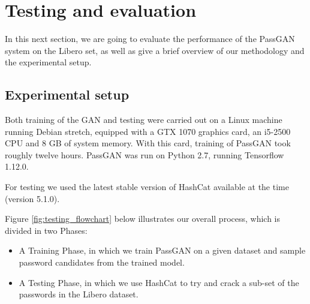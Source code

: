 \section{Testing and evaluation}\label{sec:testing_and_evaluation}
In this next section, we are going to evaluate the performance of the PassGAN system on the Libero set, as well as give a brief overview of our methodology and the experimental setup.

\subsection{Experimental setup}
Both training of the GAN and testing were carried out on a Linux machine running Debian stretch, equipped with a GTX 1070 graphics card, an i5-2500 CPU and 8 GB of system memory. 
With this card, training of PassGAN took roughly twelve hours.
PassGAN was run on Python 2.7, running Tensorflow 1.12.0.%

For testing we used the latest stable version of HashCat available at the time (version 5.1.0). %

Figure \ref{fig:testing_flowchart} below illustrates our overall process, which is divided in two Phases: 
\begin{itemize}
    \item A Training Phase, in which we train PassGAN on a given dataset and sample password candidates from the trained model.
    \item A Testing Phase, in which we use HashCat to try and crack a sub-set of the passwords in the Libero dataset.
\end{itemize}

